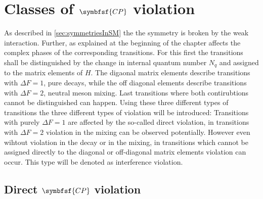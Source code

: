 \section[head={Types of \CP violation},tocentry={Classes of \CP violation}]{Classes of $\symbfsf{C{}P}$ violation}
\label{sec:CPVClasses}

As described in \cref{sec:symmetriesInSM} the the \CP symmetry is broken by the weak interaction.
Further, as explained at the beginning of the chapter \CP affects the complex phases of the corresponding transitions.
For this first the transitions shall be distinguished by the change in internal quantum number $N_q$ and assigned to the matrix elements of $H$.
The digaonal matrix elements describe transitions with $\Delta F=1$, \ie pure decays, while the off diagonal elements describe transitions with $\Delta F=2$, \ie neutral meson mixing.
Last transitions where both contirubtions cannot be distinguished can happen.
Using these three different types of transitions the three different types of \CP violation will be introduced:
Transitions with purely $\Delta F=1$ are affected by the so-called direct \CP violation, in transitions with $\Delta F=2$ \CP violation in the mixing can be observed potentially.
However even wihtout \CP violation in the decay or in the mixing, in transitions which cannot be assigned directly to the diagonal or off-diagonal matrix elements \CP violation can occur.
This type will be denoted as interference \CP violation.

\subsection[head={Direct \CP violation},tocentry={Direct \CP violation}]{Direct $\symbfsf{C{}P}$ violation}
\label{sec:DirectCPV}

